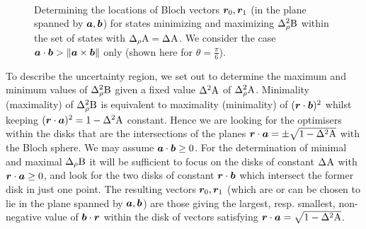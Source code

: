 \begin{figure}[h]
  \centering
  \begin{minipage}{0.45\textwidth}
    \subcaption{$\boa\cdot\bor > \boa\cdot\bob \iff \sdev{\opa} < \|\boa\times\bob\|$}
  \end{minipage}\hfill
  \begin{minipage}{0.45\textwidth}
    \subcaption{$\boa\cdot\bor = \boa\cdot\bob > \boa\cdot\bob^\prime = \|\boa\times\bob\| \iff \sdev{\opa} = \|\boa\times\bob\|$}
  \end{minipage}\\
  \begin{minipage}{0.45\textwidth}
    \subcaption{$\boa\cdot\bor = \boa\cdot\bob^\prime = \|\boa\times\bob\| \iff \sdev{\opa} =\boa\cdot\bob$}
  \end{minipage}\hfill
  \begin{minipage}{0.45\textwidth}
  \end{minipage}
  \label{fig:semicircle-min}
  \caption[The Bloch vectors of the states minimizing and maximizing $\varr{\opb}$ given $\sdevr{\opa}=\sdev{\opa}$]{Determining the locations of Bloch vectors $\bm{r}_0,\bm{r}_1$ (in the plane spanned by $\bm{a},\bm{b}$) for states minimizing and maximizing $\varr{\opb}$ within the set of states with $\sdevr{\opa}=\sdev{\opa}$. We consider the case $\bm{a}\cdot\bm{b} > \|\bm{a}\times\bm{b}\|$ only (shown here for $\theta = \frac{\pi}{6}$). }\label{fig:min-max}
\end{figure}


To describe the uncertainty region, we set out to determine the maximum and minimum values of $\varr{\opb}$ given a fixed value $\var{\opa}$ of $\varr{\opa}$.
Minimality (maximality) of $\varr{\opb}$   is equivalent to maximality (minimality) of $(\bm{r}\cdot\bm{b})^2$ whilst keeping $(\bor\cdot\boa)^2=1-\var{\opa}$ constant. Hence we are looking for the optimisers within the disks that are the intersections of the planes $\bor\cdot\boa=\pm\sqrt{1-\var{\opa}}$ with the Bloch sphere. We may assume $\bm{a}\cdot\bm{b}\ge0$. For the determination of minimal and maximal $\sdevr{\opb}$  it will be sufficient to focus on the disks of constant $\sdev{\opa}$ with $\bm{r}\cdot\bm{a}\ge0$, and look for the two disks of constant  $\bm{r}\cdot\bm{b}$ which intersect the former disk in just one point. The resulting vectors $\bm{r}_0,\bm{r}_1$ (which are or can be chosen to lie in the plane spanned by $\bm{a},\bm{b}$) are those giving the largest, resp. smallest, non-negative value of $\bm{b}\cdot\bm{r}$ within the disk of vectors satisfying $\bor\cdot\boa=\sqrt{1-\var{\opa}}$.

